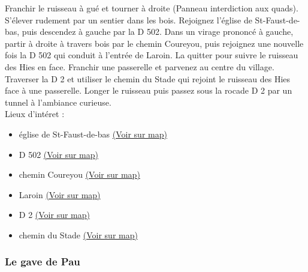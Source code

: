 \documentclass[titlepage]{article}
\begin{document}
                        Franchir le ruisseau à gué et tourner à droite (Panneau interdiction aux quads). S'élever rudement par un sentier dans les bois. Rejoignez l'église de St-Faust-de-bas, puis descendez à gauche par la D 502. Dans un virage prononcé à gauche, partir à droite à travers bois par le chemin Coureyou, puis rejoignez une nouvelle fois la D 502 qui conduit à l'entrée de Laroin. La quitter pour suivre le ruisseau des Hies en face. Franchir une passerelle et parvenez au centre du village. Traverser la D 2 et utiliser le chemin du Stade qui rejoint le ruisseau des Hies face à une passerelle. Longer le ruisseau puis passez sous la rocade D 2 par un tunnel à l'ambiance curieuse. 
                    \\
        Lieux d'intéret : 
        \begin{itemize}
        
        \item {
        église de
                            St-Faust-de-bas 
        \href{https://www.google.com/maps/?q=43.287530, -0.391115}{(Voir sur map)}
        }
    
        \item {
        D 502 
        \href{https://www.google.com/maps/?q=43.287530, -0.391115}{(Voir sur map)}
        }
    
        \item {
        chemin
                            Coureyou 
        \href{https://www.google.com/maps/?q=43.287530, -0.391115}{(Voir sur map)}
        }
    
        \item {
        Laroin 
        \href{https://www.google.com/maps/?q=43.287530, -0.391115}{(Voir sur map)}
        }
    
        \item {
        D 2 
        \href{https://www.google.com/maps/?q=43.287530, -0.391115}{(Voir sur map)}
        }
    
        \item {
        chemin du
                            Stade 
        \href{https://www.google.com/maps/?q=43.287530, -0.391115}{(Voir sur map)}
        }
    
        \end{itemize}
    
        
        \subsubsection{Le gave de Pau}
        \paragraph{}
        
\end{document}
